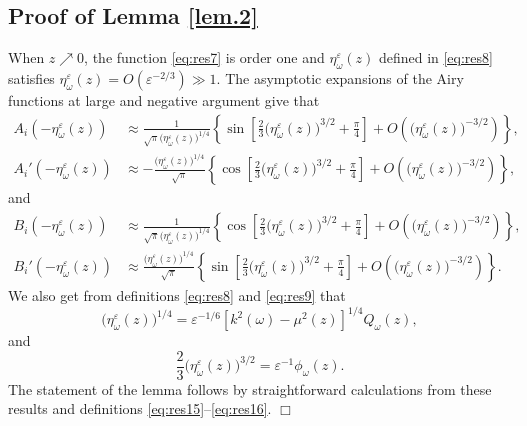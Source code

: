 \documentclass[final]{siamltex}
\begin{document}
\subsection{Proof of Lemma \ref{lem.2}}
\label{ap:propagator.2} When $z \nearrow 0$, the 
function \eqref{eq:res7} is order one and $\eta_{\omega}^{\varepsilon}(z)$ defined in 
\eqref{eq:res8} satisfies
$
\eta_{\omega}^{\varepsilon}(z) = O( {\varepsilon}^{-2/3}) \gg 1.
$
The asymptotic expansions of the Airy functions at
large and negative argument  \cite[chapter
  10]{abramowitz1972handbook} give that 
\begin{align}
A_i(-\eta_{\omega}^{\varepsilon}(z)) &\approx \frac{1}{\sqrt{\pi}
  \big(\eta_{\omega}^{\varepsilon}(z)\big)^{1/4}} \left\{\sin \left[ \frac{2}{3}
  \big(\eta_{\omega}^{\varepsilon}(z)\big)^{3/2} + \frac{\pi}{4} \right]+
  O\left(\big(\eta_{\omega}^{\varepsilon}(z)\big)^{-3/2}\right)\right\} ,
\\ A_i'(-\eta_{\omega}^{\varepsilon}(z)) &\approx
-\frac{\big(\eta_{\omega}^{\varepsilon}(z)\big)^{1/4}}{\sqrt{\pi}} \left\{ \cos
\left[ \frac{2}{3} \big(\eta_{\omega}^{\varepsilon}(z)\big)^{3/2} + \frac{\pi}{4}\right] +
  O\left(\big(\eta_{\omega}^{\varepsilon}(z)\big)^{-3/2}\right)\right\},
\end{align}
and 
\begin{align}
B_i(-\eta_{\omega}^{\varepsilon}(z)) &\approx \frac{1}{\sqrt{\pi}
  \big(\eta_{\omega}^{\varepsilon}(z)\big)^{1/4}}\left\{ \cos \left[ \frac{2}{3}
  \big(\eta_{\omega}^{\varepsilon}(z)\big)^{3/2} + \frac{\pi}{4} \right] +
O\left(\big(\eta_{\omega}^{\varepsilon}(z)\big)^{-3/2}\right) \right\},
\\ B_i'(-\eta_{\omega}^{\varepsilon}(z)) &\approx
\frac{\big(\eta_{\omega}^{\varepsilon}(z)\big)^{1/4}}{\sqrt{\pi}}\left\{ \sin \left[
  \frac{2}{3} \big(\eta_{\omega}^{\varepsilon}(z)\big)^{3/2} + \frac{\pi}{4}\right]+
  O\left(\big(\eta_{\omega}^{\varepsilon}(z)\big)^{-3/2}\right)\right\}.
\end{align}
We also get from definitions \eqref{eq:res8} and \eqref{eq:res9} that 
\begin{equation}
\big(\eta_{\omega}^{\varepsilon}(z)\big)^{1/4} = {\varepsilon}^{-1/6} [k^2({\omega})-\mu^2(z)]^{1/4} Q_{\omega}(z),
\end{equation}
and 
\begin{equation}
\frac{2}{3} \big(\eta_{\omega}^{\varepsilon}(z)\big)^{3/2} = {\varepsilon}^{-1} \phi_{\omega}(z).
\end{equation}
The statement of the lemma follows by straightforward calculations
from these results and definitions \eqref{eq:res15}--\eqref{eq:res16}. $\Box$
\end{document}
